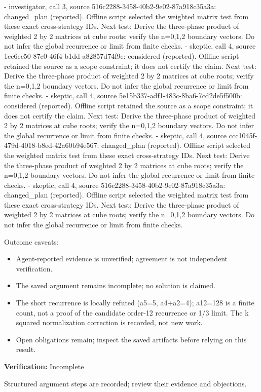 \documentclass[11pt]{article}
\begin{document}
- investigator, call 3, source 516c2288-3458-40b2-9e02-87a918c35a3a: changed\_plan (reported). Offline script selected the weighted matrix test from these exact cross-strategy IDs. Next test: Derive the three-phase product of weighted 2 by 2 matrices at cube roots; verify the n=0,1,2 boundary vectors. Do not infer the global recurrence or limit from finite checks.
- skeptic, call 4, source 1cc6ec50-87c0-46f4-b1dd-a82857d74f9e: considered (reported). Offline script retained the source as a scope constraint; it does not certify the claim. Next test: Derive the three-phase product of weighted 2 by 2 matrices at cube roots; verify the n=0,1,2 boundary vectors. Do not infer the global recurrence or limit from finite checks.
- skeptic, call 4, source 5e15b337-adf1-483c-8ba6-7cd2de5f500b: considered (reported). Offline script retained the source as a scope constraint; it does not certify the claim. Next test: Derive the three-phase product of weighted 2 by 2 matrices at cube roots; verify the n=0,1,2 boundary vectors. Do not infer the global recurrence or limit from finite checks.
- skeptic, call 4, source ccc1045f-479d-4018-b8ed-42a60b94e567: changed\_plan (reported). Offline script selected the weighted matrix test from these exact cross-strategy IDs. Next test: Derive the three-phase product of weighted 2 by 2 matrices at cube roots; verify the n=0,1,2 boundary vectors. Do not infer the global recurrence or limit from finite checks.
- skeptic, call 4, source 516c2288-3458-40b2-9e02-87a918c35a3a: changed\_plan (reported). Offline script selected the weighted matrix test from these exact cross-strategy IDs. Next test: Derive the three-phase product of weighted 2 by 2 matrices at cube roots; verify the n=0,1,2 boundary vectors. Do not infer the global recurrence or limit from finite checks.\par
Outcome caveats:\par
\begin{itemize}
\item Agent-reported evidence is unverified; agreement is not independent verification.
\item The saved argument remains incomplete; no solution is claimed.
\item The short recurrence is locally refuted (a5=5, a4+a2=4); a12=128 is a finite count, not a proof of the candidate order-12 recurrence or 1/3 limit. The k squared normalization correction is recorded, not new work.
\item Open obligations remain; inspect the saved artifacts before relying on this result.
\end{itemize}
\textbf{Verification:} Incomplete\par
Structured argument steps are recorded; review their evidence and objections.\par
\end{document}
